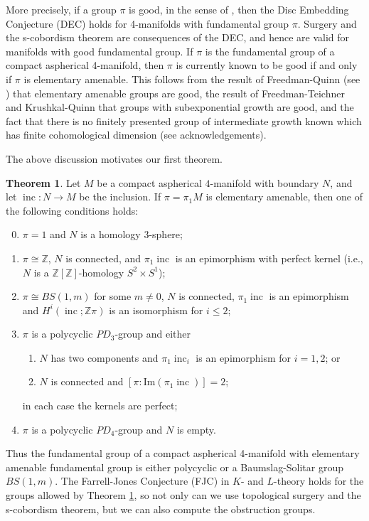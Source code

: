 \documentclass[12pt]{amsart}
\renewcommand{\leq}{\leqslant}
\theoremstyle{definition}
\newtheorem{maintheorem}{Theorem}
\newcommand{\Z}{\mathbb Z}
\DeclareMathOperator{\inc}{inc}
\begin{document}
More precisely,  if a group $\pi$ is good, in the sense of \cite[Definition 12.12]{BKKPR},
then the Disc Embedding Conjecture (DEC) holds for 4-manifolds 
with fundamental group $\pi$.   
Surgery and the s-cobordism theorem are consequences of the DEC, 
and hence are valid for manifolds with good fundamental group.  
If $\pi$ is the fundamental group of a compact aspherical 4-manifold, 
then $\pi$ is currently known to be good if and only if $\pi$ is elementary amenable.  This follows from the result of Freedman-Quinn (see \cite[Part III]{BKKPR}) that elementary amenable groups are good, the result of Freedman-Teichner \cite{FT95}  and Krushkal-Quinn \cite{KQ} that groups with subexponential growth are good, and the fact that  there is no finitely presented group of intermediate growth  known which has finite cohomological dimension (see acknowledgements).
  
The above discussion motivates our first theorem.
  
 \begin{maintheorem} \label{A}
Let $M$ be a compact aspherical $4$-manifold with boundary $N$,
and let $\inc:N\to{M}$ be the inclusion.
If $\pi=\pi_1M$ is elementary amenable, then one of the following conditions holds:
\begin{enumerate}
 \setcounter{enumi}{-1}
\item$\pi=1$ and $N$ is a homology $3$-sphere;
\item$\pi\cong\mathbb{Z}$, $N$ is connected, and $\pi_1\inc$ 
is an epimorphism with perfect kernel 
(i.e.,  $N$ is a $\Z[\Z]$-homology $S^2\times{S^1}$);
\item$\pi\cong{BS(1,m)}$ for some $m\not=0$, $N$ is connected, 
$\pi_1\inc$ is an epimorphism and $H^i(\inc;\Z\pi)$ is an isomorphism
for $i\leq2$; 
\item$\pi$ is a polycyclic $PD_3$-group and either 
\begin{enumerate}
\item$N$ has 
two components and $\pi_1\inc_i$ is an epimorphism for $i=1,2$;
or 
\item$N$ is connected and $[\pi:\mathrm{Im}(\pi_1\inc)]=2$;
\end{enumerate}
 in each case the kernels are perfect; 
\item$\pi$ is a polycyclic $PD_4$-group and $N$ is empty.
\end{enumerate}
\end{maintheorem}

Thus the fundamental group of a compact aspherical 4-manifold with elementary amenable fundamental group is either polycyclic or a Baumslag-Solitar group $BS(1,m)$.  
The Farrell-Jones Conjecture (FJC) in $K$- and $L$-theory holds for the groups
allowed by Theorem \ref{A}, so not only can we use topological surgery and the s-cobordism theorem, but we can also compute the obstruction groups.
\end{document}
